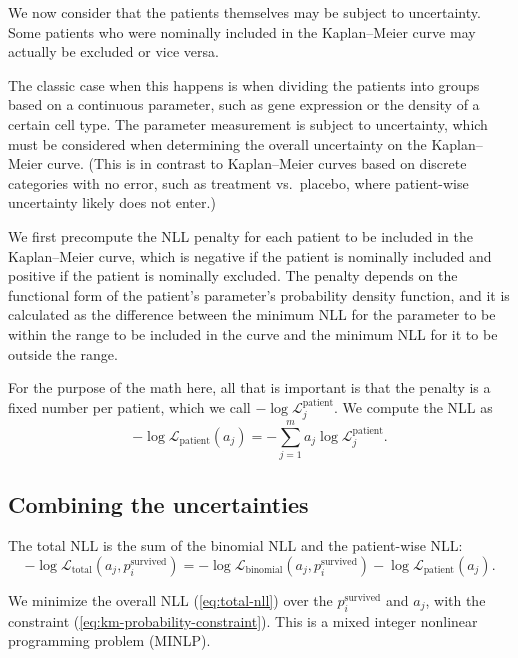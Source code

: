 \documentclass[article]{jss}
\newcommand{\KM}{Kaplan--Meier} %
\begin{document}
We now consider that the patients themselves may be subject to uncertainty.  Some patients who were nominally included in the \KM{} curve may actually be excluded or vice versa.

The classic case when this happens is when dividing the patients into groups based on a continuous parameter, such as gene expression or the density of a certain cell type.  The parameter measurement is subject to uncertainty, which must be considered when determining the overall uncertainty on the \KM{} curve.  (This is in contrast to \KM{} curves based on discrete categories with no error, such as treatment vs.\ placebo, where patient-wise uncertainty likely does not enter.)

We first precompute the NLL penalty for each patient to be included in the \KM{} curve, which is negative if the patient is nominally included and positive if the patient is nominally excluded.  The penalty depends on the functional form of the patient's parameter's probability density function, and it is calculated as the difference between the minimum NLL for the parameter to be within the range to be included in the curve and the minimum NLL for it to be outside the range.

For the purpose of the math here, all that is important is that the penalty is a fixed number per patient, which we call \(-\log \mathcal{L}_j^{\text{patient}}\).  We compute the NLL as
\begin{equation}
-\log \mathcal{L}_{\text{patient}}(a_j) = -\sum_{j=1}^{m} a_j\log \mathcal{L}_j^{\text{patient}}. \label{eq:patient-nll}
\end{equation}

\subsection{Combining the uncertainties}\label{sec:combining-uncertainties}

The total NLL is the sum of the binomial NLL and the patient-wise NLL\@:
\begin{equation}
-\log \mathcal{L}_{\text{total}}(a_j, p_i^\text{survived}) = -\log \mathcal{L}_{\text{binomial}}(a_j, p_i^\text{survived}) - \log \mathcal{L}_{\text{patient}}(a_j). \label{eq:total-nll}
\end{equation}

We minimize the overall NLL (\ref{eq:total-nll}) over the \(p_i^\text{survived}\) and \(a_j\), with the constraint (\ref{eq:km-probability-constraint}).  This is a mixed integer nonlinear programming problem (MINLP).
\end{document}
